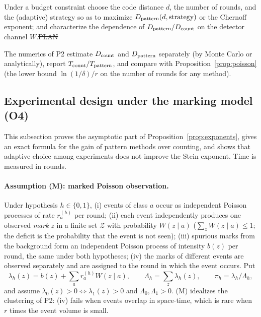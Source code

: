 \begin{problem}\label{prob:O4}
Under a budget constraint choose the code distance $d$, the number of rounds, and the (adaptive) strategy so as to maximize $D_{\rm pattern}(d,\text{strategy})$ or the Chernoff exponent;
and characterize the dependence of $D_{\rm pattern}/D_{\rm count}$ on the detector channel $W$.\hfill\st{PLAN}
\end{problem}
\noindent The numerics of P2 estimate $D_{\rm count}$ and $D_{\rm pattern}$ separately (by Monte Carlo or analytically), report $T_{\rm count}/T_{\rm pattern}$, and compare with Proposition~\ref{prop:poisson}
(the lower bound $\ln(1/\delta)/r$ on the number of rounds for any method).

\subsection{Experimental design under the marking model (O4)}\label{sec:design-theorems}

This subsection proves the asymptotic part of Proposition~\ref{prop:exponents}, gives an exact formula for the gain of pattern methods over counting, and shows that adaptive choice among experiments does not improve the Stein exponent. Time is measured in rounds.

\paragraph{Assumption (M): marked Poisson observation.} Under hypothesis $h\in\{0,1\}$, (i) events of class $a$ occur as independent Poisson processes of rate $r^{(h)}_a$ per round; (ii) each event independently produces one observed \emph{mark} $z$ in a finite set $\mathcal Z$ with probability $W(z\mid a)$ ($\sum_zW(z\mid a)\le1$; the deficit is the probability that the event is not seen); (iii) spurious marks from the background form an independent Poisson process of intensity $b(z)$ per round, the same under both hypotheses; (iv) the marks of different events are observed separately and are assigned to the round in which the event occurs. Put
\[
\lambda_h(z)=b(z)+\sum_ar^{(h)}_aW(z\mid a),\qquad\Lambda_h=\sum_z\lambda_h(z),\qquad\pi_h=\lambda_h/\Lambda_h,
\]
and assume $\lambda_0(z)>0\Leftrightarrow\lambda_1(z)>0$ and $\Lambda_0,\Lambda_1>0$.
(M) idealizes the clustering of P2: (iv) fails when events overlap in space-time, which is rare when $r$ times the event volume is small.

